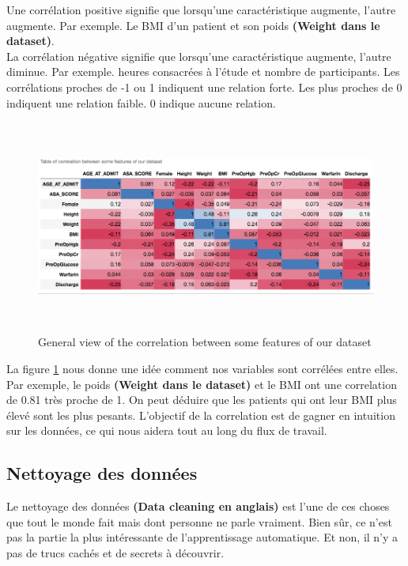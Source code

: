 \documentclass[12pt, french]{article}
\begin{document}
Une corrélation positive signifie que lorsqu'une caractéristique augmente, l'autre augmente. Par exemple. Le BMI d'un patient et son poids\textbf{ (Weight dans le dataset)}.\\

La corrélation négative signifie que lorsqu'une caractéristique augmente, l'autre diminue. Par exemple. heures consacrées à l'étude et nombre de participants. Les corrélations proches de -1 ou 1 indiquent une relation forte. Les plus proches de 0 indiquent une relation faible. 0 indique aucune relation.

\begin{figure}[h]
\includegraphics[width=17.5cm, height =7cm]{images/correlation.png}
\caption{General view of the correlation between some features of our dataset}
\label{fig:correlation}
\end{figure}

La figure \ref{fig:correlation} nous donne une idée comment nos variables sont corrélées entre elles. Par exemple, le poids \textbf{ (Weight dans le dataset)} et le BMI ont une correlation de 0.81 très proche de 1. On peut déduire que les patients qui ont leur BMI plus élevé sont les plus pesants. L'objectif de la correlation est de gagner en intuition sur les données, ce qui nous aidera tout au long du flux de travail.   

\subsection{Nettoyage des données}
Le nettoyage des données \textbf{(Data cleaning en anglais)} est l'une de ces choses que tout le monde fait mais dont personne ne parle vraiment. Bien sûr, ce n'est pas la partie la plus intéressante de l'apprentissage automatique. Et non, il n'y a pas de trucs cachés et de secrets à découvrir.
\end{document}
